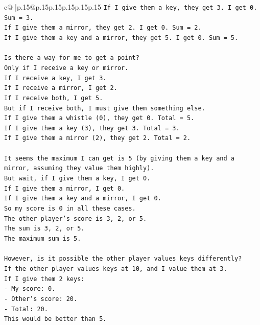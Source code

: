 \documentclass{article}
\begin{document}
{\begin{supertabular}{c@{$\;$}|p{.15\linewidth}@{}p{.15\linewidth}p{.15\linewidth}p{.15\linewidth}p{.15\linewidth}p{.15\linewidth}}
{{{\texttt{If I give them a key, they get 3. I get 0. Sum = 3.} \\
\texttt{If I give them a mirror, they get 2. I get 0. Sum = 2.} \\
\texttt{If I give them a key and a mirror, they get 5. I get 0. Sum = 5.} \\
\\ 
\texttt{Is there a way for me to get a point?} \\
\texttt{Only if I receive a key or mirror.} \\
\texttt{If I receive a key, I get 3.} \\
\texttt{If I receive a mirror, I get 2.} \\
\texttt{If I receive both, I get 5.} \\
\texttt{But if I receive both, I must give them something else.} \\
\texttt{If I give them a whistle (0), they get 0. Total = 5.} \\
\texttt{If I give them a key (3), they get 3. Total = 3.} \\
\texttt{If I give them a mirror (2), they get 2. Total = 2.} \\
\\ 
\texttt{It seems the maximum I can get is 5 (by giving them a key and a mirror, assuming they value them highly).} \\
\texttt{But wait, if I give them a key, I get 0.} \\
\texttt{If I give them a mirror, I get 0.} \\
\texttt{If I give them a key and a mirror, I get 0.} \\
\texttt{So my score is 0 in all these cases.} \\
\texttt{The other player's score is 3, 2, or 5.} \\
\texttt{The sum is 3, 2, or 5.} \\
\texttt{The maximum sum is 5.} \\
\\ 
\texttt{However, is it possible the other player values keys differently?} \\
\texttt{If the other player values keys at 10, and I value them at 3.} \\
\texttt{If I give them 2 keys:} \\
\texttt{{-} My score: 0.} \\
\texttt{{-} Other's score: 20.} \\
\texttt{{-} Total: 20.} \\
\texttt{This would be better than 5.} \\
}}}
\end{supertabular}}
\end{document}
